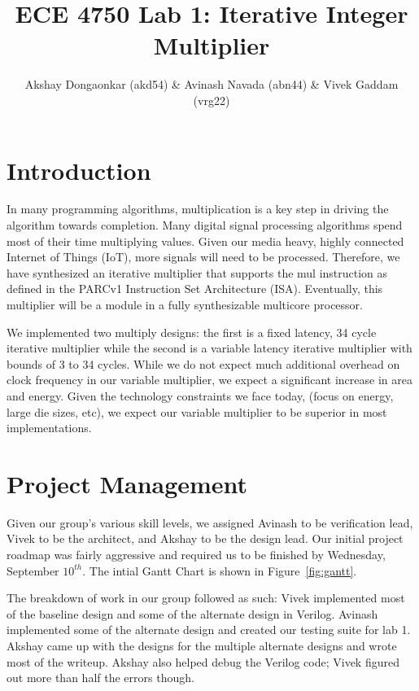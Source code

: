 \documentclass[11pt]{article}
\begin{document}
\title{ECE 4750 Lab 1: Iterative Integer Multiplier}
\author{Akshay Dongaonkar (akd54) \& Avinash Navada (abn44) \& Vivek Gaddam (vrg22)}
\maketitle

\section{Introduction}

In many programming algorithms, multiplication is a key step in driving the algorithm towards completion. 
Many digital signal processing algorithms spend most of their time multiplying values. 
Given our media heavy, highly connected Internet of Things (IoT), more signals will need to be processed.
Therefore, we have synthesized an iterative multiplier that supports the mul instruction as defined in the PARCv1 Instruction Set Architecture (ISA).
Eventually, this multiplier will be a module in a fully synthesizable multicore processor.

We implemented two multiply designs: the first is a fixed latency, 34 cycle iterative multiplier while the second is a variable latency
iterative multiplier with bounds of 3 to 34 cycles.
While we do not expect much additional overhead on clock frequency in our variable multiplier,
we expect a significant increase in area and energy.
Given the technology constraints we face today, (focus on energy, large die sizes, etc),
we expect our variable multiplier to be superior in most implementations. 


\section{Project Management}

Given our group's various skill levels, we assigned Avinash to be verification lead, Vivek to be the architect, and Akshay to be the design lead.
Our initial project roadmap was fairly aggressive and required us to be finished by Wednesday, September $10^{th}$.
The intial Gantt Chart is shown in Figure~\ref{fig:gantt}.

The breakdown of work in our group followed as such:
Vivek implemented most of the baseline design and some of the alternate design in Verilog. 
Avinash implemented some of the alternate design and created our testing suite for lab 1.
Akshay came up with the designs for the multiple alternate designs and wrote most of the writeup.
Akshay also helped debug the Verilog code; Vivek figured out more than half the errors though.
\end{document}
